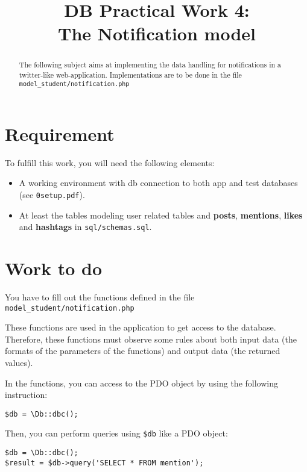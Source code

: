\documentclass[twoside,a4paper,12pt]{article}
\title{DB Practical Work 4:\\The Notification model}
\date{}
\begin{document}
\maketitle

\begin{abstract}
  The following subject aims at implementing the data handling for notifications in a twitter-like web-application. Implementations are to be done in the file \texttt{model\_student/notification.php}
\end{abstract}

\tableofcontents

\clearpage

\section{Requirement}
To fulfill this work, you will need the following elements:

\begin{itemize}
\item A working environment with db connection to both app and test databases (see \texttt{0setup.pdf}).
\item At least the tables modeling user related tables and \textbf{posts}, \textbf{mentions}, \textbf{likes} and \textbf{hashtags} in \texttt{sql/schemas.sql}.
\end{itemize}

\section{Work to do}
You have to fill out the functions defined in the file \texttt{model\_student/notification.php}

These functions are used in the application to get access to the database. Therefore, these functions must observe some rules about both input data (the formats of the parameters of the functions) and output data (the returned values).

In the functions, you can access to the PDO object by using the following instruction:

\begin{lstlisting}
$db = \Db::dbc();
\end{lstlisting}

Then, you can perform queries using \texttt{\$db} like a PDO object:
\begin{lstlisting}
$db = \Db::dbc();
$result = $db->query('SELECT * FROM mention');
\end{lstlisting}
\end{document}
